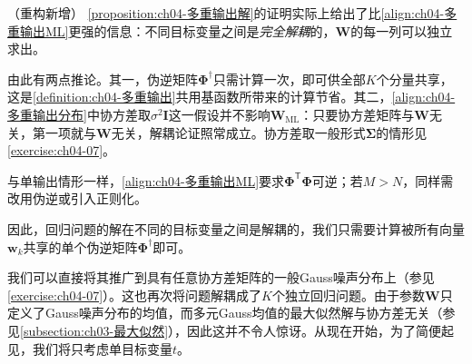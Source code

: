 \documentclass[../../main.tex]{subfiles}
\begin{document}
\begin{remark}（重构新增）
\cref{proposition:ch04-多重输出解}的证明实际上给出了比\eqref{align:ch04-多重输出ML}更强的信息：不同目标变量之间是\emph{完全解耦}的，$\boldsymbol{W}$的每一列可以独立求出。

由此有两点推论。其一，伪逆矩阵$\boldsymbol{\Phi}^{\dagger}$只需计算一次，即可供全部$K$个分量共享，这是\cref{definition:ch04-多重输出}共用基函数所带来的计算节省。其二，\eqref{align:ch04-多重输出分布}中协方差取$\sigma^2\boldsymbol{I}$这一假设并不影响$\boldsymbol{W}_{\mathrm{ML}}$：只要协方差矩阵与$\boldsymbol{W}$无关，第一项就与$\boldsymbol{W}$无关，解耦论证照常成立。协方差取一般形式$\boldsymbol{\Sigma}$的情形见\cref{exercise:ch04-07}。

与单输出情形一样，\eqref{align:ch04-多重输出ML}要求$\boldsymbol{\Phi}^{\mathsf{T}}\boldsymbol{\Phi}$可逆；若$M>N$，同样需改用伪逆或引入正则化。
\end{remark}

因此，回归问题的解在不同的目标变量之间是解耦的，我们只需要计算被所有向量$\boldsymbol{w}_k$共享的单个伪逆矩阵$\boldsymbol{\Phi}^{\dagger}$即可。

我们可以直接将其推广到具有任意协方差矩阵的一般Gauss噪声分布上（参见\cref{exercise:ch04-07}）。这也再次将问题解耦成了$K$个独立回归问题。由于参数$\boldsymbol{W}$只定义了Gauss噪声分布的均值，而多元Gauss均值的最大似然解与协方差无关（参见\cref{subsection:ch03-最大似然}），因此这并不令人惊讶。从现在开始，为了简便起见，我们将只考虑单目标变量$t$。
\end{document}
